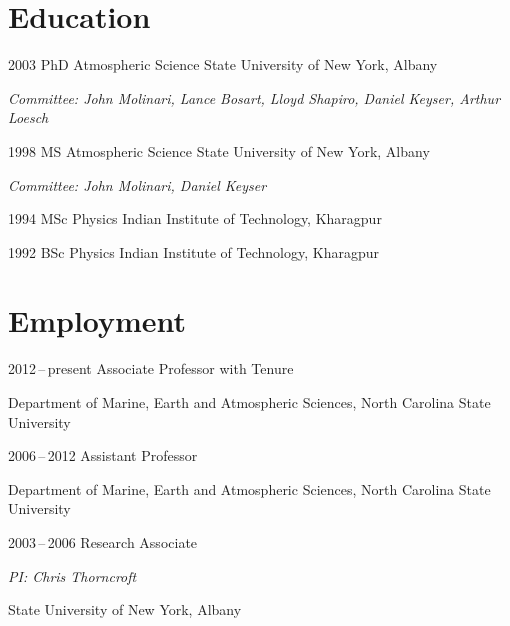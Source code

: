 \section*{Education}

\begin{tlist}


  

\item[2003] PhD \hspace{3mm} Atmospheric Science \hspace{4mm} State University of New York, Albany
  
      {\small \emph{Committee: John Molinari, Lance Bosart, Lloyd Shapiro, Daniel Keyser, Arthur Loesch}}
      \vspace{2mm}
      
\item[1998] MS  \hspace{5mm} Atmospheric Science \hspace{4mm} State University of New York, Albany
  
        {\small \emph{Committee: John Molinari, Daniel Keyser}}
        \vspace{2mm}
        
\item[1994] MSc \hspace{4mm}  Physics \hspace{25mm} Indian Institute of Technology, Kharagpur
  \vspace{2mm}
  
\item[1992] BSc \hspace{5mm} Physics \hspace{25mm} Indian Institute of Technology, Kharagpur
\end{tlist}

\section*{Employment}

\begin{tlist}
\item[2012\,--\,present] Associate Professor with Tenure
  
  Department of Marine, Earth and Atmospheric Sciences,  North Carolina State University
      \vspace{2mm}

\item[2006\,--\,2012] Assistant Professor

  Department of Marine, Earth and Atmospheric Sciences, North Carolina State University
      \vspace{2mm}

\item[2003\,--\,2006] Research Associate
  
  {\small \emph {PI: Chris Thorncroft}}

  State University of New York, Albany
  
  
\end{tlist}

